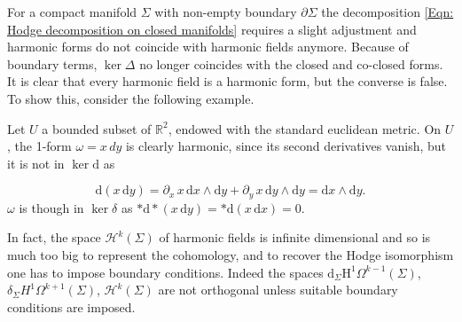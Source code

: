 For a compact manifold $\Sigma$ with non-empty boundary $\partial\Sigma$ the decomposition \eqref{Eqn: Hodge decomposition on closed manifolds} requires a slight adjustment and harmonic forms do not coincide with harmonic fields anymore.
Because of boundary terms, $\ker\Delta$ no longer coincides with the closed and co-closed forms. It is clear that every harmonic field is a harmonic form, but the converse is false. To show this, consider the following example.
\begin{Example}
	Let $U$ a bounded subset of $\mathbb{R}^2$, endowed with the standard euclidean metric. On $U$, the 1-form $\omega=x \,dy$ is clearly harmonic, since its second derivatives vanish, but it is not in $\ker \mathrm{d}$ as
	
	\[\mathrm{d}(x\, \mathrm{d}y) = \partial_x\, x\, \mathrm{d}x \wedge \mathrm{d}y + \partial_y\, x\, \mathrm{d}y \wedge \mathrm{d}y = \mathrm{d}x \wedge \mathrm{d}y.\] $\omega$ is though in $\ker \delta$ as $\ast \mathrm{d} \ast (x\, \mathrm{d}y) =\ast \mathrm{d}(x \,\mathrm{d}x) = 0$.
\end{Example}


In fact, the space $\mathcal{H}^k(\Sigma)$ of harmonic fields is infinite dimensional and so is much too big to represent the cohomology, and to recover the Hodge isomorphism one has to impose boundary conditions. Indeed the spaces $\mathrm{d}_\Sigma \mathrm{H}^1\Omega^{k-1}(\Sigma)$, $\delta_\Sigma H^{1}\Omega^{k+1}(\Sigma)$, $\mathcal{H}^k(\Sigma)$ are not orthogonal unless suitable boundary conditions are imposed.

